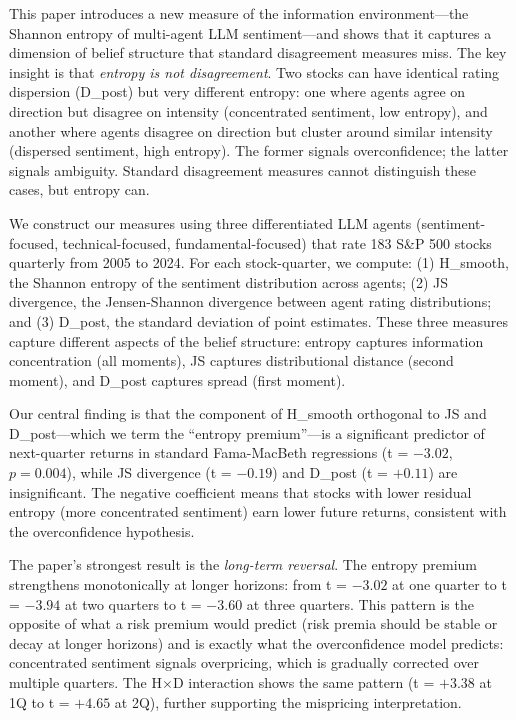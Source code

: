 \documentclass[12pt,a4paper]{article}
\begin{document}
This paper introduces a new measure of the information environment---the Shannon entropy of multi-agent LLM sentiment---and shows that it captures a dimension of belief structure that standard disagreement measures miss. The key insight is that \textit{entropy is not disagreement}. Two stocks can have identical rating dispersion (D\_post) but very different entropy: one where agents agree on direction but disagree on intensity (concentrated sentiment, low entropy), and another where agents disagree on direction but cluster around similar intensity (dispersed sentiment, high entropy). The former signals overconfidence; the latter signals ambiguity. Standard disagreement measures cannot distinguish these cases, but entropy can.

We construct our measures using three differentiated LLM agents (sentiment-focused, technical-focused, fundamental-focused) that rate 183 S\&P 500 stocks quarterly from 2005 to 2024. For each stock-quarter, we compute: (1) H\_smooth, the Shannon entropy of the sentiment distribution across agents; (2) JS divergence, the Jensen-Shannon divergence between agent rating distributions; and (3) D\_post, the standard deviation of point estimates. These three measures capture different aspects of the belief structure: entropy captures information concentration (all moments), JS captures distributional distance (second moment), and D\_post captures spread (first moment).

Our central finding is that the component of H\_smooth orthogonal to JS and D\_post---which we term the ``entropy premium''---is a significant predictor of next-quarter returns in standard Fama-MacBeth regressions (t = $-3.02$, $p = 0.004$), while JS divergence (t = $-0.19$) and D\_post (t = $+0.11$) are insignificant. The negative coefficient means that stocks with lower residual entropy (more concentrated sentiment) earn lower future returns, consistent with the overconfidence hypothesis.

The paper's strongest result is the \textit{long-term reversal}. The entropy premium strengthens monotonically at longer horizons: from t = $-3.02$ at one quarter to t = $-3.94$ at two quarters to t = $-3.60$ at three quarters. This pattern is the opposite of what a risk premium would predict (risk premia should be stable or decay at longer horizons) and is exactly what the \citet{Daniel1998} overconfidence model predicts: concentrated sentiment signals overpricing, which is gradually corrected over multiple quarters. The H$\times$D interaction shows the same pattern (t = $+3.38$ at 1Q to t = $+4.65$ at 2Q), further supporting the mispricing interpretation.
\end{document}
